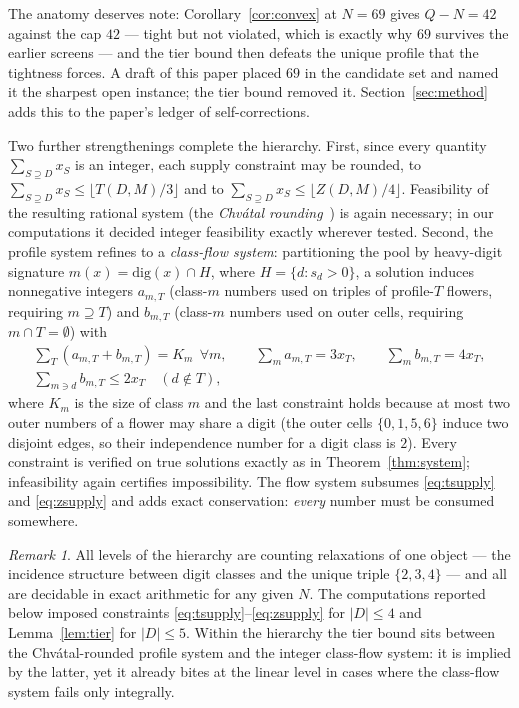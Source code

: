 \documentclass[11pt]{article}
\theoremstyle{definition}
\theoremstyle{remark}
\newtheorem{remark}{Remark}
\begin{document}
The anatomy deserves note: Corollary~\ref{cor:convex} at $N=69$ gives $Q-N=42$ against the cap
$42$ --- tight but not violated, which is exactly why $69$ survives the earlier screens ---
and the tier bound then defeats the unique profile that the tightness forces. A draft of
this paper placed $69$ in the candidate set and named it the sharpest open instance; the
tier bound removed it. Section~\ref{sec:method} adds this to the paper's ledger of
self-corrections.

Two further strengthenings complete the hierarchy. First, since every quantity $\sum_{S\supseteq D}x_S$ is an integer, each supply constraint may be rounded, to $\sum_{S\supseteq D}x_S \le \lfloor T(D,M)/3\rfloor$ and to $\sum_{S\supseteq D}x_S \le \lfloor Z(D,M)/4\rfloor$. Feasibility of the resulting rational system (the \emph{Chv\'atal rounding}~\cite{Chvatal73}) is again necessary; in our computations it decided integer feasibility exactly wherever tested. Second, the profile system refines to a \emph{class-flow system}: partitioning the pool by heavy-digit signature $m(x) = \mathrm{dig}(x)\cap H$, where $H=\{d: s_d>0\}$, a solution induces nonnegative integers $a_{m,T}$ (class-$m$ numbers used on triples of profile-$T$ flowers, requiring $m\supseteq T$) and $b_{m,T}$ (class-$m$ numbers used on outer cells, requiring $m\cap T=\emptyset$) with
\begin{gather*}
\sum_T (a_{m,T}+b_{m,T}) = K_m \ \ \forall m,\qquad
\sum_m a_{m,T} = 3x_T,\qquad \sum_m b_{m,T}=4x_T,\\
\sum_{m\ni d} b_{m,T} \le 2x_T \quad (d\notin T),
\end{gather*}
where $K_m$ is the size of class $m$ and the last constraint holds because at most two outer numbers of a flower may share a digit (the outer cells $\{0,1,5,6\}$ induce two disjoint edges, so their independence number for a digit class is $2$). Every constraint is verified on true solutions exactly as in Theorem~\ref{thm:system}; infeasibility again certifies impossibility. The flow system subsumes \eqref{eq:tsupply} and \eqref{eq:zsupply} and adds exact conservation: \emph{every} number must be consumed somewhere.

\begin{remark}
All levels of the hierarchy are counting relaxations of one object --- the incidence structure between digit classes and the unique triple $\{2,3,4\}$ --- and all are decidable in exact arithmetic for any given $N$. The computations reported below imposed constraints \eqref{eq:tsupply}--\eqref{eq:zsupply} for $|D|\le 4$ and Lemma~\ref{lem:tier} for $|D|\le 5$. Within the hierarchy the tier bound sits between the Chv\'atal-rounded profile system and the integer class-flow system: it is implied by the latter, yet it already bites at the linear level in cases where the class-flow system fails only integrally.
\end{remark}
\end{document}
